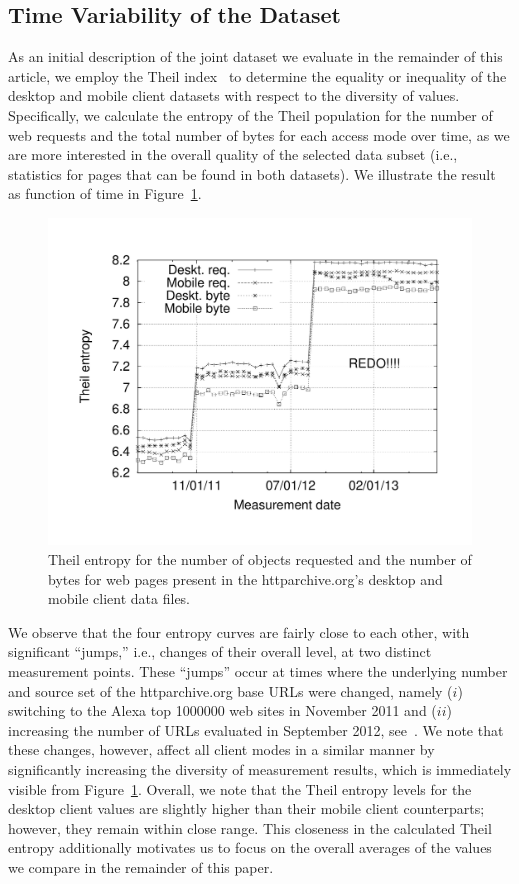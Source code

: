 \documentclass[onecolumn,12pt]{IEEEtran}
\begin{document}
\subsection{Time Variability of the Dataset}
As an initial description of the joint dataset we evaluate in the remainder of this article, we employ the Theil index~\cite{Th72} to determine the equality or inequality of the desktop and mobile client datasets with respect to the diversity of values.
Specifically, we calculate the entropy of the Theil population for the number of web requests and the total number of bytes for each access mode over time, as we are more interested in the overall quality of the selected data subset (i.e., statistics for pages that can be found in both datasets).
We illustrate the result as function of time in Figure~\ref{fig:theil}.
\begin{figure}
	\centering
	\includegraphics[width=.5\linewidth]{theil}
	\caption{Theil entropy for the number of objects requested and the number of bytes for web pages present in the httparchive.org's desktop and mobile client data files.}
	\label{fig:theil}
\end{figure}
We observe that the four entropy curves are fairly close to each other, with significant ``jumps,'' i.e., changes of their overall level, at two distinct measurement points. 
These ``jumps'' occur at times where the underlying number and source set of the httparchive.org base URLs were changed, namely ($i$) switching to the Alexa top 1000000 web sites in November 2011 and ($ii$) increasing the number of URLs evaluated in September 2012, see~\cite{ht13}.
We note that these changes, however, affect all client modes in a similar manner by significantly increasing the diversity of measurement results, which is immediately visible from Figure~\ref{fig:theil}.
Overall, we note that the Theil entropy levels for the desktop client values are slightly higher than their mobile client counterparts; however, they remain within close range.
This closeness in the calculated Theil entropy additionally motivates us to focus on the overall averages of the values we compare in the remainder of this paper.
\end{document}
